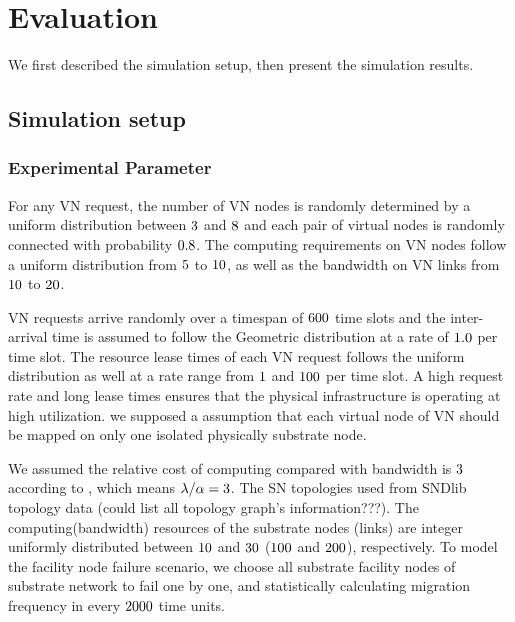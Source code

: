 
\section{Evaluation}
\label{sec:Evaluation}
We first described the simulation setup, then present the simulation results.

\subsection{Simulation setup}

\subsubsection{Experimental Parameter}
For any VN request, the number of VN nodes is randomly determined by a uniform distribution between $3$ and $8$ and each pair of virtual nodes is randomly connected with probability $0.8$. The computing requirements on VN nodes follow a uniform distribution from $5$ to $10$, as well as the bandwidth on VN links from $10$ to $20$.

VN requests arrive randomly over a timespan of $600$ time slots and the inter-arrival time is
assumed to follow the Geometric distribution at a rate of $1.0$ per time slot. The resource lease times of each VN request follows the uniform distribution as well at a rate  range from $1$ and $100$ per time slot. A high request rate and long lease times ensures that the physical infrastructure is operating at high utilization. we supposed a assumption that each virtual node of VN should be mapped on only one isolated physically substrate node.

We assumed the relative cost of computing compared with bandwidth is $3$ according to  \cite{armbrust2009above,yu2010survivable}, which means $\lambda/\alpha=3$.
The SN topologies used from SNDlib topology data \cite{orlowski2010sndlib}(could list all topology graph's information???).
The computing(bandwidth) resources of the substrate nodes (links) are integer uniformly distributed between $10$ and $30$ ($100$ and $200$), respectively. To model the facility node failure scenario, we choose all substrate facility nodes of substrate network to fail one by one, and statistically calculating migration frequency in every $2000$ time units.


